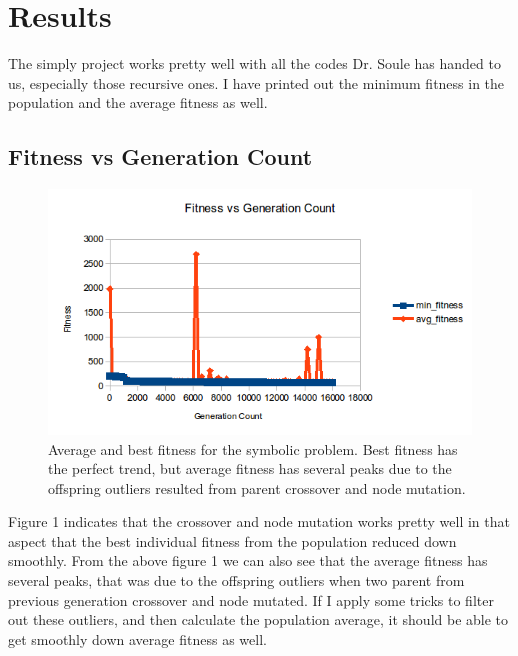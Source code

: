 \documentclass[10pt,b5paper]{article}
\begin{document}
\section{Results}
\label{sec-2}
The simply project works pretty well with all the codes Dr. Soule has handed to us, especially those recursive ones. I have printed out the minimum fitness in the population and the average fitness as well. 
\subsection{Fitness vs Generation Count}
\label{sec-2-1}
\begin{figure}[htb]
\centering
\includegraphics[width=.9\linewidth]{./fitness.png}
\caption{Average and best fitness for the symbolic problem. Best fitness has the perfect trend, but average fitness has several peaks due to the offspring outliers resulted from parent crossover and node mutation.}
\end{figure}
Figure 1 indicates that the crossover and node mutation works pretty well in that aspect that the best individual fitness from the population reduced down smoothly. 
From the above figure 1 we can also see that the average fitness has several peaks, that was due to the offspring outliers when two parent from previous generation crossover and node mutated. If I apply some tricks to filter out these outliers, and then calculate the population average, it should be able to get smoothly down average fitness as well. 
\end{document}
